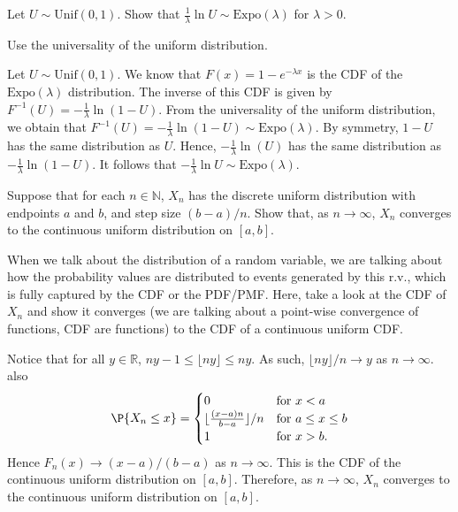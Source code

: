 	\begin{exercise}
		Let $U \sim \text{Unif}(0,1)$. Show that $\frac{1}{\lambda} \ln U \sim \text{Expo}(\lambda)$ for $\lambda > 0$.
		\begin{hint}
			Use the universality of the uniform distribution.
		\end{hint}
		\begin{solution}
			Let $U \sim \text{Unif}(0,1)$. We know that $F(x) = 1 - e^{- \lambda x}$ is the CDF of the $\text{Expo}(\lambda)$ distribution. The inverse of this CDF is given by $F^{-1}(U) = - \frac{1}{\lambda} \ln(1 - U)$. From the universality of the uniform distribution, we obtain that $F^{-1}(U) = - \frac{1}{\lambda} \ln(1 - U) \sim \text{Expo}(\lambda)$. By symmetry, $1 - U$ has the same distribution as $U$. Hence, $- \frac{1}{\lambda} \ln(U)$ has the same distribution as $- \frac{1}{\lambda} \ln(1 - U)$. It follows that $- \frac{1}{\lambda} \ln U \sim \text{Expo}(\lambda)$.
		\end{solution}
	\end{exercise}
	
	\begin{exercise}
		Suppose that for each $n \in \mathbb{N}$, $X_{n}$ has the discrete uniform distribution with endpoints $a$ and $b$, and step size $(b - a) / n$. Show that, as $n \to \infty$, $X_n$ converges to the continuous uniform distribution on $[a, b]$.
		\begin{hint}
			When we talk about the distribution of a random variable, we are talking about how the probability values are distributed to events generated by this r.v., which is fully captured by the CDF or the PDF/PMF. Here, take a look at the CDF of $X_n$ and show it converges (we are talking about a point-wise convergence of functions, CDF are functions) to the CDF of a continuous uniform CDF.
		\end{hint}
		\begin{solution}
			Notice that for all $y \in \mathbb{R}$, $ny - 1 \le \lfloor ny \rfloor \le ny $. As such, $ \lfloor n y \rfloor / n \to y $ as $n\rightarrow \infty$. also
			\begin{equation*}
				\P{X_n\leq x}=\begin{cases}
					0 &\text{for } x<a\\
					\lfloor\frac{(x-a)n}{b-a}\rfloor/n &\text{for } a\leq x\leq b\\
					1&\text{for } x>b.
				\end{cases}	
			\end{equation*} 
			Hence $ F_n(x) \to (x - a) / (b - a) $ as $n\rightarrow \infty$. This is the CDF of the continuous uniform distribution on $[a,b]$. Therefore, as $n \to \infty$, $X_n$ converges to the continuous uniform distribution on $[a, b]$.
		\end{solution}
	\end{exercise}

